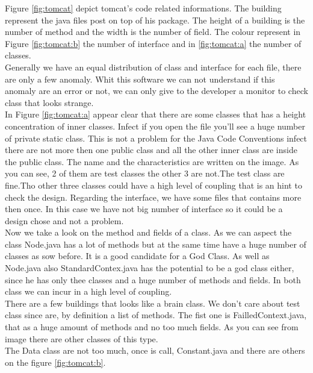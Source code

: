 \documentclass[]{usiinfbachelorproject}
\begin{document}
Figure \ref{fig:tomcat} depict tomcat's code related informations. The building represent the java files post on top of his package. The height of a building is the number of method and the width is the number of field. The colour represent in Figure \ref{fig:tomcat:b} the number of interface and in \ref{fig:tomcat:a} the number of classes.\\ 
Generally we have an equal distribution of class and interface for each file, there are only a few anomaly. Whit this software we can not understand if this anomaly are an error or not, we can only give to the developer a monitor to check class that looks strange.\\
In Figure \ref{fig:tomcat:a} appear clear that there are some classes that has a height concentration of inner classes. Infect if you open the file you'll see a huge number of private static class. This is not a problem for the Java Code Conventions  \cite{oracle} infect there are not more then one public class and all the other inner class are inside the public class. The name and the characteristics are written on the image. As you can see, 2 of them are test classes the other 3 are not.The test class are fine.Tho other three classes could have a high level of coupling that is an hint to check the design.
Regarding the interface, we  have some  files that contains more then once. In this case we have not big number of interface so it could be a design  chose and not a problem.\\
Now we take a look on the method and fields of a class. As we can aspect the class Node.java has a lot of methods but at the same time have a huge number of classes as sow before.
It is a good candidate for a God Class. As well as Node.java also StandardContex.java has the potential to be a god class either,  since he has only thee classes and a huge number of methods and fields. In both class we can incur in a high level of coupling.\\
There are a few buildings that looks like a brain class. We don't care about test class since are, by definition a list of methods. The fist one is FailledContext.java, that as a huge amount of methods and no too much fields. As you can see from image there are other classes of this type.\\
The Data class are not too much, once is call,  Constant.java and there are others on the figure \ref{fig:tomcat:b}.
\end{document}
